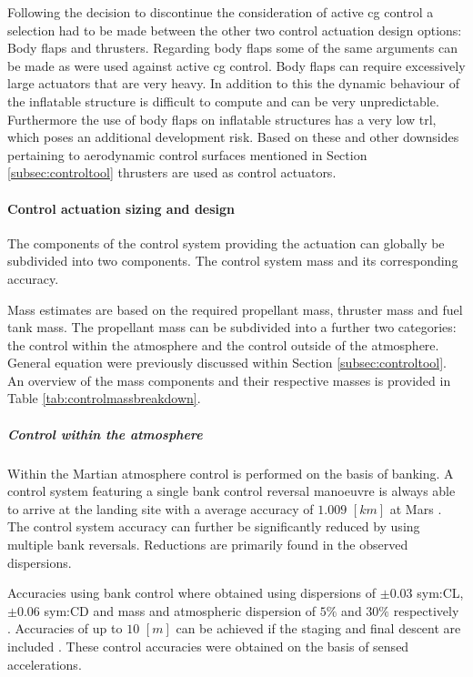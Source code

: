 Following the decision to discontinue the consideration of active \gls{cg} control a selection had to be made between the other two control actuation design options: Body flaps and thrusters. Regarding body flaps some of the same arguments can be made as were used against active \gls{cg} control. Body flaps can require excessively large actuators that are very heavy. In addition to this the dynamic behaviour of the inflatable structure is difficult to compute and can be very unpredictable. Furthermore the use of body flaps on inflatable structures has a very low \gls{trl}, which poses an additional development risk. Based on these and other downsides pertaining to aerodynamic control surfaces mentioned in Section \ref{subsec:controltool} thrusters are used as control actuators.

\paragraph{Control actuation sizing and design}

The components of the control system providing the actuation can globally be subdivided into two components. The control system mass and its corresponding accuracy.

Mass estimates are based on the required propellant mass, thruster mass and fuel tank mass. The propellant mass can be subdivided into a further two categories: the control within the atmosphere and the control outside of the atmosphere. General equation were previously discussed within Section \ref{subsec:controltool}. An overview of the mass components and their respective masses is provided in Table \ref{tab:controlmassbreakdown}.

\subparagraph{Control within the atmosphere} 

Within the Martian atmosphere control is performed on the basis of banking. A control system featuring a single bank control reversal manoeuvre is always able to arrive at the landing site with a average accuracy of $1.009$ $[km]$ at Mars \cite{Lu2007}. The control system accuracy can further be significantly reduced by using multiple bank reversals. Reductions are primarily found in the observed dispersions.

Accuracies using bank control where obtained using dispersions of $\pm 0.03 $ \gls{sym:CL}, $\pm 0.06 $ \gls{sym:CD} and mass and atmospheric dispersion of $5\%$ and $30\%$ respectively \cite{Lu2007}. Accuracies of up to $10$ $[m]$ can be achieved if the staging and final descent are included \cite{Davis2010}. These control accuracies were obtained on the basis of sensed accelerations.

